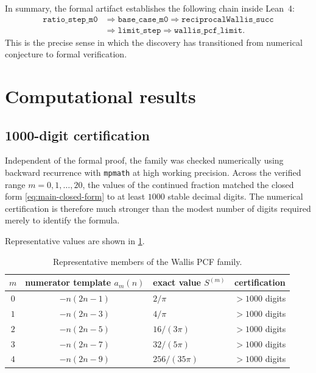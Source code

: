 \documentclass[11pt,reqno]{amsart}
\theoremstyle{plain}
\theoremstyle{definition}
\theoremstyle{remark}
\begin{document}
In summary, the formal artifact establishes the following chain inside Lean~4:
\[
\begin{aligned}
  \texttt{ratio\_step\_m0} &\Longrightarrow \texttt{base\_case\_m0}
    \Longrightarrow \texttt{reciprocalWallis\_succ} \\
  &\Longrightarrow \texttt{limit\_step}
    \Longrightarrow \texttt{wallis\_pcf\_limit}.
\end{aligned}
\]
This is the precise sense in which the discovery has transitioned from numerical conjecture to formal verification.

\section{Computational results}\label{sec:computational}

\subsection{1000-digit certification}

Independent of the formal proof, the family was checked numerically using backward recurrence with \texttt{mpmath} at high working precision.  Across the verified range $m=0,1,\dots,20$, the values of the continued fraction matched the closed form \eqref{eq:main-closed-form} to at least $1000$ stable decimal digits.  The numerical certification is therefore much stronger than the modest number of digits required merely to identify the formula.

Representative values are shown in \cref{tab:values}.

\begin{table}[ht]
\centering
\caption{Representative members of the Wallis PCF family.}\label{tab:values}
\begin{tabular}{@{}cclc@{}}
\toprule
$m$ & numerator template $a_m(n)$ & exact value $S^{(m)}$ & certification \\
\midrule
$0$ & $-n(2n-1)$ & $2/\pi$ & $>1000$ digits \\
$1$ & $-n(2n-3)$ & $4/\pi$ & $>1000$ digits \\
$2$ & $-n(2n-5)$ & $16/(3\pi)$ & $>1000$ digits \\
$3$ & $-n(2n-7)$ & $32/(5\pi)$ & $>1000$ digits \\
$4$ & $-n(2n-9)$ & $256/(35\pi)$ & $>1000$ digits \\
\bottomrule
\end{tabular}
\end{table}
\end{document}

